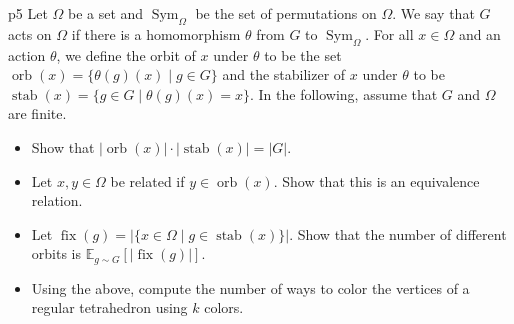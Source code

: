 \documentclass[a4paper, 11pt]{article}
\newcounter{problem}
\begin{document}
\begin{problem}{%
}{p5%
}
Let $\Omega$ be a set and $\operatorname{Sym}_{\Omega}$ be the set of permutations on $\Omega$. We say that $G$ acts on $\Omega$ if there is a homomorphism $\theta$ from $G$ to $\operatorname{Sym}_{\Omega}$. For all $x \in \Omega$ and an action $\theta$, we define the orbit of $x$ under $\theta$ to be the set $\operatorname{orb}(x)=\{\theta(g)(x) \mid g \in G\}$ and the stabilizer of $x$ under $\theta$ to be $\operatorname{stab}(x)=\{g \in G \mid \theta(g)(x)=x\}$. In the following, assume that $G$ and $\Omega$ are finite.
\begin{itemize}
	 \item Show that $|\operatorname{orb}(x)| \cdot|\operatorname{stab}(x)|=|G|$.
\item Let $x, y \in \Omega$ be related if $y \in \operatorname{orb}(x)$. Show that this is an equivalence relation.
\item Let $\operatorname{fix}(g)=|\{x \in \Omega \mid g \in \operatorname{stab}(x)\}|$. Show that the number of different orbits is $\mathbb{E}_{g \sim G}[|\operatorname{fix}(g)|]$.
\item Using the above, compute the number of ways to color the vertices of a regular tetrahedron using $k$ colors.
\end{itemize}
\end{problem}
\end{document}

